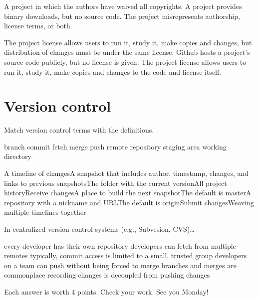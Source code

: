 \documentclass[addpoints]{exam}
\begin{document}
\begin{questions}

\question A project in which the authors have waived all copyrights. \answerline[F]
\question A project provides binary downloads, but no source code. \answerline[E]
\question The project misrepresents authorship, license terms, or both. \answerline[D]

\question The project license allows users to run it, study it, make copies and changes, but distribution of changes must be under the same license. \answerline[B]
\question Github hosts a project's source code publicly, but no license is given. \answerline[A]
\question The project license allows users to run it, study it, make copies and changes to the code and license itself. \answerline[C]

\section{Version control}

Match version control terms with the definitions.

\begin{oneparchoices}
\choice branch
\choice commit
\choice fetch
\choice merge
\choice push
\choice remote
\choice repository
\choice staging area
\choice working directory
\end{oneparchoices}

\question A timeline of changes\answerline[A]
\question A snapshot that includes author, timestamp, changes, and links to previous snapshots\answerline[B]
\question The folder with the current version\answerline[I]
\question All project history\answerline[G]
\question Receive changes\answerline[C]
\question A place to build the next snapshot\answerline[H]
\question The default is master\answerline[A]
\question A repository with a nickname and URL\answerline[F]
\question The default is origin\answerline[F]
\question Submit changes\answerline[E]
\question Weaving multiple timelines together\answerline[D]

\question In centralized version control systems (e.g., Subvesion, CVS)\ldots

\begin{choices}
\choice every developer has their own repository
\choice developers can fetch from multiple remotes
\choice typically, commit access is limited to a small, trusted group
\choice developers on a team can push without being forced to merge
\choice branches and merges are commonplace
\choice recording changes is decoupled from pushing changes
\end{choices}

\answerline[C]

\end{questions}

Each answer is worth $4$ points. Check your work. See you Monday!
\end{document}
